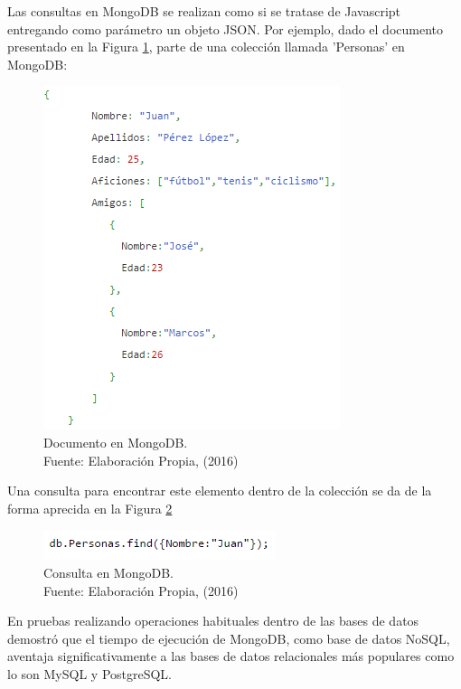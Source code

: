 Las consultas en MongoDB se realizan como si se tratase de Javascript entregando como parámetro un objeto JSON. Por ejemplo, dado el documento presentado en la Figura \ref{fig:MongoJsonExample}, parte de una colección llamada 'Personas' en MongoDB:

\begin{figure}[H]
	\centering
	\captionsetup{justification=centering}
	\includegraphics[scale=0.8]{images/MongoJsonExample.png}
	\caption[Documento en MongoDB.]{Documento en MongoDB.\\Fuente: Elaboración Propia, (2016)}
	\label{fig:MongoJsonExample}
\end{figure}

Una consulta para encontrar este elemento dentro de la colección se da de la forma aprecida en la Figura \ref{fig:MongoJsonQueryExample}

\begin{figure}[H]
	\centering
	\captionsetup{justification=centering}
	\includegraphics[scale=0.8]{images/MongoJsonQueryExample.png}
	\caption[Consulta en MongoDB.]{Consulta en MongoDB.\\Fuente: Elaboración Propia, (2016)}
	\label{fig:MongoJsonQueryExample}
\end{figure}

En pruebas realizando operaciones habituales dentro de las bases de datos \cite{MongoPerformance} demostró que el tiempo de ejecución de MongoDB, como base de datos NoSQL, aventaja significativamente a las bases de datos relacionales más populares como lo son MySQL y PostgreSQL.

